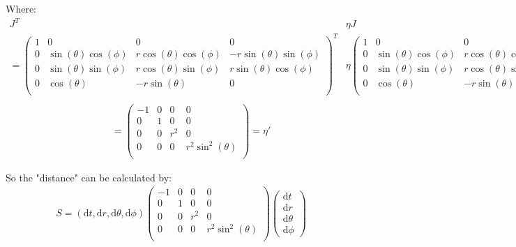 \documentclass[]{ctexart}
\newcommand{\di}{\mathrm{d}}
\begin{document}
			Where:
				\begin{equation*}
					\begin{aligned}
					J^T&\eta J\\
					=
					\left(
					\begin{array}{cccc}
					1 & 0 & 0 & 0 \\
					0 & \sin (\theta ) \cos (\phi ) & r \cos (\theta ) \cos (\phi ) & -r \sin (\theta ) \sin (\phi ) \\
					0 & \sin (\theta ) \sin (\phi ) & r \cos (\theta ) \sin (\phi ) & r \sin (\theta ) \cos (\phi ) \\
					0 & \cos (\theta ) & -r \sin (\theta ) & 0 \\
					\end{array}
					\right)^T
					&\eta
					\left(
					\begin{array}{cccc}
					1 & 0 & 0 & 0 \\
					0 & \sin (\theta ) \cos (\phi ) & r \cos (\theta ) \cos (\phi ) & -r \sin (\theta ) \sin (\phi ) \\
					0 & \sin (\theta ) \sin (\phi ) & r \cos (\theta ) \sin (\phi ) & r \sin (\theta ) \cos (\phi ) \\
					0 & \cos (\theta ) & -r \sin (\theta ) & 0 \\
					\end{array}
					\right)\\
					\end{aligned}
				\end{equation*}
				\begin{equation*}
				\begin{aligned}
				\qquad=\left(
				\begin{array}{cccc}
				-1 & 0 & 0 & 0 \\
				0 & 1 & 0 & 0 \\
				0 & 0 & r^2 & 0 \\
				0 & 0 & 0 & r^2 \sin ^2(\theta ) \\
				\end{array}
				\right)=\eta'
				\end{aligned}
				\end{equation*}
			
			So the "distance" can be calculated by:
				\begin{equation*}
				\begin{aligned}
					S=
					\left(\di t, \di r,\di \theta,\di \phi \right)
					\left(
					\begin{array}{cccc}
					-1 & 0 & 0 & 0 \\
					0 & 1 & 0 & 0 \\
					0 & 0 & r^2 & 0 \\
					0 & 0 & 0 & r^2 \sin ^2(\theta ) \\
					\end{array}
					\right)
					\begin{pmatrix}
					\di t \\
					\di r\\
					\di \theta\\
					\di \phi
					\end{pmatrix}
				\end{aligned}
				\end{equation*}
		
\end{document}
